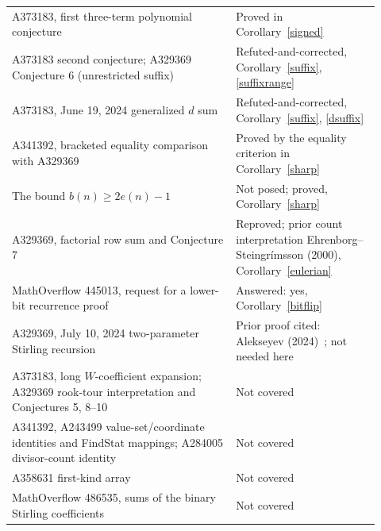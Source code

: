 \documentclass[11pt]{article}
\begin{document}
\begin{longtable}{>{\raggedright\arraybackslash}p{0.56\linewidth}>{\raggedright\arraybackslash}p{0.36\linewidth}}
A373183, first three-term polynomial conjecture & Proved in Corollary~\ref{signed}\\
A373183 second conjecture; A329369 Conjecture 6 (unrestricted suffix) & Refuted-and-corrected, Corollary~\ref{suffix}, \eqref{suffixrange}\\
A373183, June 19, 2024 generalized $d$ sum & Refuted-and-corrected, Corollary~\ref{suffix}, \eqref{dsuffix}\\
A341392, bracketed equality comparison with A329369 & Proved by the equality criterion in Corollary~\ref{sharp}\\
The bound $b(n)\geq2e(n)-1$ & Not posed; proved, Corollary~\ref{sharp}\\
A329369, factorial row sum and Conjecture 7 & Reproved; prior count interpretation Ehrenborg--Steingr\'imsson (2000), Corollary~\ref{eulerian}\\
MathOverflow 445013, request for a lower-bit recurrence proof & Answered: yes, Corollary~\ref{bitflip}\\
A329369, July 10, 2024 two-parameter Stirling recursion & Prior proof cited: Alekseyev (2024)~\cite{alekseyev}; not needed here\\
A373183, long $W$-coefficient expansion; A329369 rook-tour interpretation and Conjectures 5, 8--10 & Not covered\\
A341392, A243499 value-set/coordinate identities and FindStat mappings; A284005 divisor-count identity & Not covered\\
A358631 first-kind array & Not covered\\
MathOverflow 486535, sums of the binary Stirling coefficients~\cite{aggregate} & Not covered\\
\bottomrule
\end{longtable}
\endgroup
\end{document}
